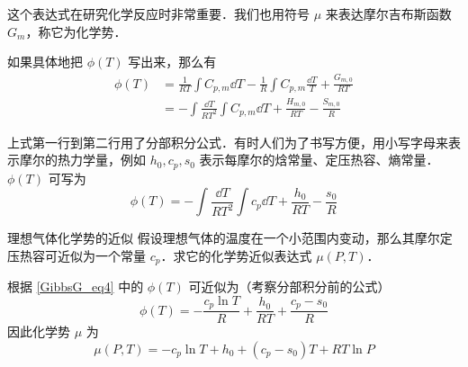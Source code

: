 这个表达式在研究化学反应时非常重要．我们也用符号 $\mu$ 来表达摩尔吉布斯函数 $G_m$，称它为化学势．

如果具体地把 $\phi(T)$ 写出来，那么有
\begin{equation}\label{GibbsG_eq4}
\begin{aligned}
\phi(T)&=\frac{1}{RT}\int C_{p,m}\dd T-\frac{1}{R}\int C_{p,m}\frac{\dd T}{T}+\frac{G_{m,0}}{RT}\\
&=-\int \frac{\dd T}{RT^2}\int C_{p,m}\dd T+\frac{H_{m,0}}{RT}-\frac{S_{m,0}}{R}
\end{aligned}
\end{equation}

上式第一行到第二行用了分部积分公式．有时人们为了书写方便，用小写字母来表示摩尔的热力学量，例如 $h_0,c_p,s_0$ 表示每摩尔的焓常量、定压热容、熵常量．$\phi(T)$ 可写为
\begin{equation}
\phi(T)=-\int\frac{\dd T}{RT^2}\int c_{p}\dd T+\frac{h_{0}}{RT}-\frac{s_{0}}{R}
\end{equation}

\begin{example}{理想气体化学势的近似}
假设理想气体的温度在一个小范围内变动，那么其摩尔定压热容可近似为一个常量 $c_p$．求它的化学势近似表达式 $\mu(P,T)$．

根据 \autoref{GibbsG_eq4} 中的 $\phi(T)$ 可近似为（考察分部积分前的公式）
\begin{equation}
\phi(T)=-\frac{c_p\ln T}{R}+\frac{h_0}{RT}+\frac{c_p-s_0}{R}
\end{equation}
因此化学势 $\mu$ 为
\begin{equation}\label{GibbsG_eq5}
\mu(P,T)=-c_p\ln T+h_0+(c_p-s_0)T+RT\ln P
\end{equation}

\end{example}
